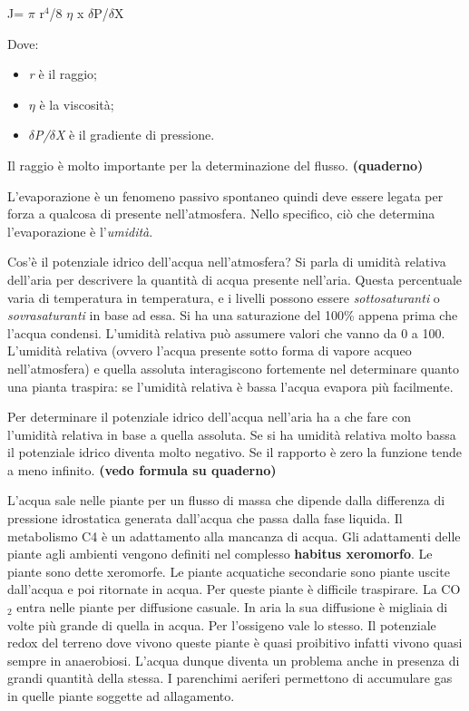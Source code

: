 \documentclass[]{article}
\begin{document}
J= $\pi$ r$^4$/8 $\eta$ x $\delta$P/$\delta$X

Dove:

\begin{itemize}
\itemsep1pt\parskip0pt
\item
  \emph{r} è il raggio;
\item
  \emph{$\eta$} è la viscosità;
\item
  \emph{$\delta$P/$\delta$X} è il gradiente di pressione.
\end{itemize}

Il raggio è molto importante per la determinazione del flusso.
\textbf{(quaderno)}

L'evaporazione è un fenomeno passivo spontaneo quindi deve essere legata
per forza a qualcosa di presente nell'atmosfera. Nello specifico, ciò
che determina l'evaporazione è l'\emph{umidità}.

Cos'è il potenziale idrico dell'acqua nell'atmosfera? Si parla di
umidità relativa dell'aria per descrivere la quantità di acqua presente
nell'aria. Questa percentuale varia di temperatura in temperatura, e i
livelli possono essere \emph{sottosaturanti} o \emph{sovrasaturanti} in
base ad essa. Si ha una saturazione del 100\% appena prima che l'acqua
condensi. L'umidità relativa può assumere valori che vanno da 0 a 100.
L'umidità relativa (ovvero l'acqua presente sotto forma di vapore acqueo
nell'atmosfera) e quella assoluta interagiscono fortemente nel
determinare quanto una pianta traspira: se l'umidità relativa è bassa
l'acqua evapora più facilmente.

Per determinare il potenziale idrico dell'acqua nell'aria ha a che fare
con l'umidità relativa in base a quella assoluta. Se si ha umidità
relativa molto bassa il potenziale idrico diventa molto negativo. Se il
rapporto è zero la funzione tende a meno infinito. \textbf{(vedo formula
su quaderno)}

L'acqua sale nelle piante per un flusso di massa che dipende dalla
differenza di pressione idrostatica generata dall'acqua che passa dalla
fase liquida. Il metabolismo C4 è un adattamento alla mancanza di acqua.
Gli adattamenti delle piante agli ambienti vengono definiti nel
complesso \textbf{habitus xeromorfo}. Le piante sono dette xeromorfe. Le
piante acquatiche secondarie sono piante uscite dall'acqua e poi
ritornate in acqua. Per queste piante è difficile traspirare. La CO$_2$
entra nelle piante per diffusione casuale. In aria la sua diffusione è
migliaia di volte più grande di quella in acqua. Per l'ossigeno vale lo
stesso. Il potenziale redox del terreno dove vivono queste piante è
quasi proibitivo infatti vivono quasi sempre in anaerobiosi. L'acqua
dunque diventa un problema anche in presenza di grandi quantità della
stessa. I parenchimi aeriferi permettono di accumulare gas in quelle
piante soggette ad allagamento.
\end{document}
